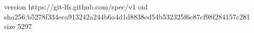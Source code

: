 version https://git-lfs.github.com/spec/v1
oid sha256:b5278f334eca913242a244b6a4d1d8838ed54b532325f6e87cf98f284157c281
size 5297
